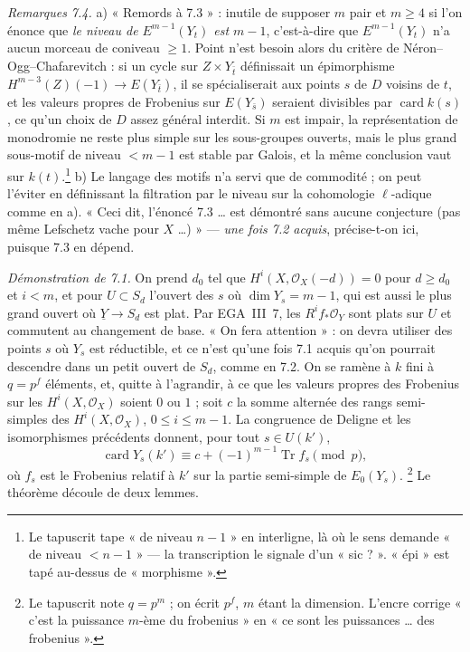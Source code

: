 \documentclass[11pt,a4paper]{article}
\begin{document}
\emph{Remarques 7.4.} a) « Remords à 7.3 » : inutile de supposer $m$ pair et
$m \geqslant 4$ si l'on énonce que \emph{le niveau de $E^{m-1}(Y_t)$ est
$m-1$}, c'est-à-dire que $E^{m-1}(Y_t)$ n'a aucun morceau de coniveau
$\geqslant 1$. Point n'est besoin alors du critère de Néron--Ogg--Chafarevitch :
si un cycle sur $Z \times Y_{\bar t}$ définissait un épimorphisme
$H^{m-3}(Z)(-1) \to E(Y_{\bar t})$, il se spécialiserait aux points $s$ de $D$
voisins de $t$, et les valeurs propres de Frobenius sur $E(Y_{\bar s})$ seraient
divisibles par $\operatorname{card} k(s)$, ce qu'un choix de $D$ assez général
interdit. Si $m$ est impair, la représentation de monodromie ne reste plus
simple sur les sous-groupes ouverts, mais le plus grand sous-motif de niveau
$< m-1$ est stable par Galois, et la même conclusion vaut sur $k(t)$.\footnote{Le
tapuscrit tape « de niveau $n-1$ » en interligne, là où le sens demande « de
niveau $< n-1$ » --- la transcription le signale d'un « sic ? ». « épi » est tapé
au-dessus de « morphisme ».} b) Le langage des motifs n'a servi que de
commodité ; on peut l'éviter en définissant la filtration par le niveau sur la
cohomologie $\ell$-adique comme en a). « Ceci dit, l'énoncé 7.3 \ldots{} est
démontré sans aucune conjecture (pas même Lefschetz vache pour $X$ \ldots) » ---
\emph{une fois 7.2 acquis}, précise-t-on ici, puisque 7.3 en dépend.

\emph{Démonstration de 7.1.} On prend $d_0$ tel que $H^i(X,
\mathcal{O}_X(-d)) = 0$ pour $d \geqslant d_0$ et $i < m$, et pour $U \subset
S_d$ l'ouvert des $s$ où $\dim Y_s = m-1$, qui est aussi le plus grand ouvert où
$\underline{Y} \to S_d$ est plat. Par EGA~III~7, les $R^if_*\mathcal{O}_Y$ sont
plats sur $U$ et commutent au changement de base. « On fera attention » : on
devra utiliser des points $s$ où $Y_s$ est réductible, et ce n'est qu'une fois
7.1 acquis qu'on pourrait descendre dans un petit ouvert de $S_d$, comme en 7.2.
On se ramène à $k$ fini à $q = p^f$ éléments, et, quitte à l'agrandir, à ce que
les valeurs propres des Frobenius sur les $H^i(X, \mathcal{O}_X)$ soient $0$ ou
$1$ ; soit $c$ la somme alternée des rangs semi-simples des $H^i(X,
\mathcal{O}_X)$, $0 \leqslant i \leqslant m-1$. La congruence de Deligne et les
isomorphismes précédents donnent, pour tout $s \in U(k')$,
\[ \operatorname{card} Y_s(k') \equiv c + (-1)^{m-1}\operatorname{Tr} f_s
\pmod p , \]
où $f_s$ est le Frobenius relatif à $k'$ sur la partie semi-simple de $E_0(Y_s)$.
\footnote{Le tapuscrit note $q = p^m$ ; on écrit $p^f$, $m$ étant la dimension.
L'encre corrige « c'est la puissance $m$-ème du frobenius » en « ce sont les
puissances \ldots{} des frobenius ».} Le théorème découle de deux lemmes.
\end{document}
